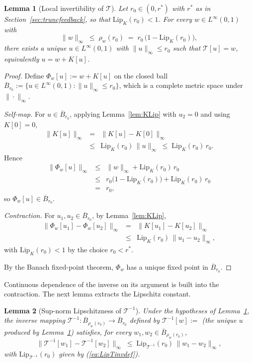 \documentclass[10pt,a4paper]{amsart}
\newtheorem{lemma}{Lemma}
\newcommand{\Tcal}{\mathcal{T}}
\newcommand{\Linf}{L^\infty}
\newcommand{\Lipk}{\mathrm{Lip}_K}
\newcommand{\LipT}{\mathrm{Lip}_{\Tcal^{-1}}}
\newcommand{\Bball}{\overline{B}}
\begin{document}
\begin{lemma}[Local invertibility of $\Tcal$]\label{lem:Tinv}
Let $r_0 \in (0, r^*)$ with $r^*$ as in Section~\ref{sec:truncfeedback}, so that $\Lipk(r_0) < 1$. For every $w \in \Linf(0,1)$ with
\begin{equation}
\|w\|_\infty \;\le\; \rho_w(r_0) \;=\; r_0\,\bigl(1 - \Lipk(r_0)\bigr),
\label{eq:winball}
\end{equation}
there exists a unique $u \in \Linf(0,1)$ with $\|u\|_\infty \le r_0$ such that $\Tcal[u] = w$, equivalently $u = w + K[u]$.
\end{lemma}

\begin{proof}
Define $\Phi_w[u] := w + K[u]$ on the closed ball $\Bball_{r_0} := \{u \in \Linf(0,1) : \|u\|_\infty \le r_0\}$, which is a complete metric space under $\|\cdot\|_\infty$.

\emph{Self-map.} For $u \in \Bball_{r_0}$, applying Lemma~\ref{lem:KLip} with $u_2 = 0$ and using $K[0] = 0$,
\begin{eqnarray}
\|K[u]\|_\infty &=& \|K[u] - K[0]\|_\infty \nonumber \\
&\le& \Lipk(r_0)\,\|u\|_\infty \;\le\; \Lipk(r_0)\, r_0.
\label{eq:Ku_norm}
\end{eqnarray}
Hence
\begin{eqnarray}
\|\Phi_w[u]\|_\infty &\le& \|w\|_\infty + \Lipk(r_0)\, r_0 \nonumber \\
&\le& r_0\bigl(1 - \Lipk(r_0)\bigr) + \Lipk(r_0)\, r_0 \nonumber \\
&=& r_0,
\label{eq:Phiw_norm}
\end{eqnarray}
so $\Phi_w[u] \in \Bball_{r_0}$.

\emph{Contraction.} For $u_1, u_2 \in \Bball_{r_0}$, by Lemma~\ref{lem:KLip},
\begin{eqnarray}
\|\Phi_w[u_1] - \Phi_w[u_2]\|_\infty &=& \|K[u_1] - K[u_2]\|_\infty \nonumber \\
&\le& \Lipk(r_0)\,\|u_1 - u_2\|_\infty,
\label{eq:Phiw_contract}
\end{eqnarray}
with $\Lipk(r_0) < 1$ by the choice $r_0 < r^*$.

By the Banach fixed-point theorem, $\Phi_w$ has a unique fixed point in $\Bball_{r_0}$.
\end{proof}

Continuous dependence of the inverse on its argument is built into the contraction. The next lemma extracts the Lipschitz constant.

\begin{lemma}[Sup-norm Lipschitzness of $\Tcal^{-1}$]\label{lem:TinvLip}
Under the hypotheses of Lemma~\ref{lem:Tinv}, the inverse mapping $\Tcal^{-1} : \Bball_{\rho_w(r_0)} \to \Bball_{r_0}$ defined by $\Tcal^{-1}[w] :=$ (the unique $u$ produced by Lemma~\ref{lem:Tinv}) satisfies, for every $w_1, w_2 \in \Bball_{\rho_w(r_0)}$,
\begin{equation}
\|\Tcal^{-1}[w_1] - \Tcal^{-1}[w_2]\|_\infty \;\le\; \LipT(r_0)\,\|w_1 - w_2\|_\infty,
\label{eq:TinvLip}
\end{equation}
with $\LipT(r_0)$ given by (\ref{eq:LipTinvdef}).
\end{lemma}
\end{document}

